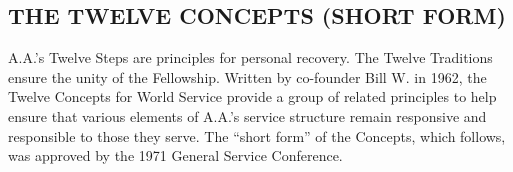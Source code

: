 

\subsection*{THE TWELVE CONCEPTS (SHORT FORM)}

\begin{biblechapter}
    A.A.’s Twelve Steps are principles for personal recovery.
\verse The Twelve Traditions ensure the unity of the Fellowship.
\verse Written by co-founder Bill W. in 1962, 
    the Twelve Concepts for World Service 
    provide a group of related principles 
    to help ensure that various elements of A.A.’s service structure 
    remain responsive and responsible to those they serve.
The “short form” of the Concepts, which follows, was approved by the 1971 General Service Conference.
\end{biblechapter}


